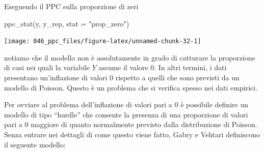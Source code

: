 \documentclass[
  11pt,
  italian,
  a4paper,
  extrafontsizes,onecolumn,openright
  ]{memoir}
\newenvironment{Shaded}{\begin{snugshade}}{\end{snugshade}}
\newcommand{\AttributeTok}[1]{\textcolor[rgb]{0.77,0.63,0.00}{#1}}
\newcommand{\FunctionTok}[1]{\textcolor[rgb]{0.00,0.00,0.00}{#1}}
\newcommand{\NormalTok}[1]{#1}
\newcommand{\StringTok}[1]{\textcolor[rgb]{0.31,0.60,0.02}{#1}}
\theoremstyle{definition}
\theoremstyle{definition}
\theoremstyle{definition}
\theoremstyle{definition}
\theoremstyle{remark}
\begin{document}
Eseguendo il PPC sulla proporzione di zeri

\begin{Shaded}
\begin{Highlighting}[]
\FunctionTok{ppc\_stat}\NormalTok{(y, y\_rep, }\AttributeTok{stat =} \StringTok{"prop\_zero"}\NormalTok{)}
\end{Highlighting}
\end{Shaded}

\begin{center}\texttt{[image: 046\_ppc\_files/figure-latex/unnamed-chunk-32-1]} \end{center}

\noindent 
notiamo che il modello non è assolutamente in grado di catturare la proporzione di casi nei quali la variabile \(Y\) assume il valore 0. In altri termini, i dati presentano un'inflazione di valori 0 rispetto a quelli che sono previsti da un modello di Poisson. Questo è un problema che si verifica spesso nei dati empirici.

Per ovviare al problema dell'inflazione di valori pari a 0 è possibile definire un modello di tipo ``hurdle'' che consente la presenza di una proporzione di valori pari a 0 maggiore di quanto normalmente previsto dalla distribuzione di Poisson. Senza entrare nei dettagli di come questo viene fatto, Gabry e Vehtari definiscono il seguente modello:
\end{document}
